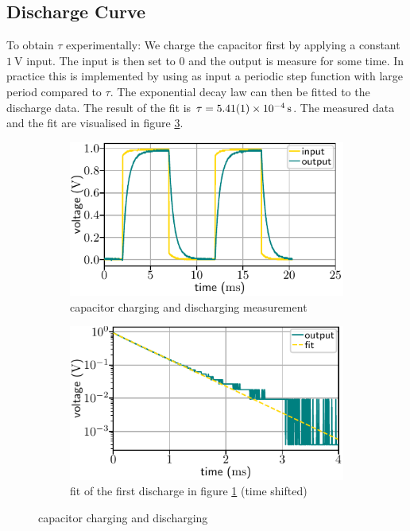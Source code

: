 \documentclass[10pt, a4paper]{article} %
\begin{document}
\subsection{Discharge Curve}
To obtain $\tau$ experimentally:
We charge the capacitor first by applying a constant $\SI{1}{\volt}$ input.
The input is then set to $0$ and the output is measure for some time.
In practice this is implemented by using as input a periodic step function with large period compared to $\tau$.
The exponential decay law can then be fitted to the discharge data.
The result of the fit is $\tau = \SI{5.41 \pm 0.01  e-4}{\second}$.
The measured data and the fit are visualised in figure \ref{fig:decay}.
  \begin{figure}
	  \centering
	  \begin{subfigure}[t]{0.495\textwidth}
         \centering
	     \includegraphics[width=\textwidth]{discharge.pdf}%
         \caption{capacitor charging and discharging measurement}\label{fig:decayd}%
     \end{subfigure}\hfill%
	  \begin{subfigure}[t]{0.495\textwidth}
         \centering
	     \includegraphics[width=\textwidth]{discharge_fit.pdf}
		  \caption{fit of the first discharge in figure \ref{fig:decayd} (time shifted)}\label{fig:decayfit}%
     \end{subfigure}%
	  \caption{capacitor charging and discharging}\label{fig:decay}%
\end{figure}
\end{document}
